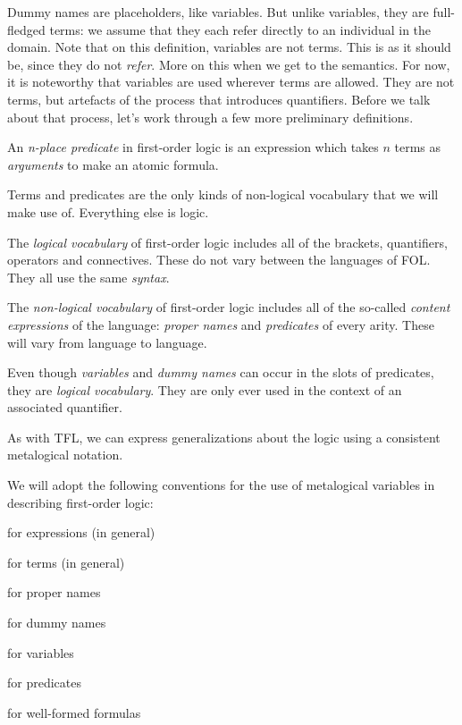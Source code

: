 Dummy names are placeholders, like variables. But unlike variables, they are
full-fledged terms: we assume that they each refer directly to an individual
in the domain. Note that on this definition, variables are not terms. This is
as it should be, since they do not \emph{refer}. More on this when we get to
the semantics. For now, it is noteworthy that variables are used wherever
terms are allowed. They are not terms, but artefacts of the process that
introduces quantifiers. Before we talk about that process, let's work through
a few more preliminary definitions.

\begin{definition}[Predicate]
  An \emph{n-place predicate} in first-order logic is an expression which
  takes $n$ terms as \emph{arguments} to make an atomic formula.
\end{definition}

Terms and predicates are the only kinds of non-logical vocabulary that we will
make use of. Everything else is logic.

\begin{definition}
  The \emph{logical vocabulary} of first-order logic includes all of the
  brackets, quantifiers, operators and connectives. These do not vary between
  the languages of FOL. They all use the same \emph{syntax}.
  
  The \emph{non-logical vocabulary} of first-order logic includes all of the
  so-called \emph{content expressions} of the language: \emph{proper names} and
  \emph{predicates} of every arity. These will vary from language to language.

  Even though \emph{variables} and \emph{dummy names} can occur in the slots of
  predicates, they are \emph{logical vocabulary}. They are only ever used in the
  context of an associated quantifier.
\end{definition}

As with TFL, we can express generalizations about the logic using a consistent
metalogical notation. 

\begin{definition}
  We will adopt the following conventions for the use of metalogical variables
  in describing first-order logic:
  \begin{argument}
  \item[\ealpha] for expressions (in general)
  \item[\etau] for terms (in general)
  \item[\enu] for proper names
  \item[\edelta] for dummy names
  \item[\exi] for variables
  \item[\ebeta] for predicates
  \item[\ephi] for well-formed formulas
  \end{argument}
\end{definition}


